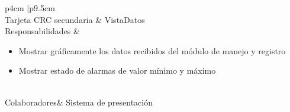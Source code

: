 \begin{table}[h!]
		\centering
		\begin{tabular}{ p{4cm} |p{9.5cm} }
		\hline 
		 \\
		\hline
		Tarjeta CRC secundaria & VistaDatos\\
		\hline
		Responsabilidades & \begin{itemize}
								\item Mostrar gráficamente los datos recibidos del módulo de manejo y registro
								\item Mostrar estado de alarmas de valor mínimo y máximo
								 \end{itemize} \\	
		\hline
		Colaboradores& Sistema de presentación \\

		\hline
		\end{tabular}
		\caption{Tarjeta CRC secundaria VistaDatos}
		\end{table}


